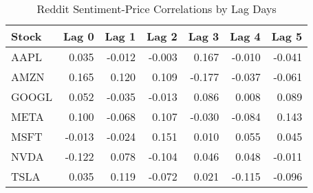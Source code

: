 \begin{table}[h!]
\centering
\caption{Reddit Sentiment-Price Correlations by Lag Days}
\label{tab:reddit_lag_correlations}
\begin{tabular}{lrrrrrr}
\hline
Stock & Lag 0 & Lag 1 & Lag 2 & Lag 3 & Lag 4 & Lag 5 \\
\hline
AAPL & 0.035 & -0.012 & -0.003 & 0.167 & -0.010 & -0.041 \\
AMZN & 0.165 & 0.120 & 0.109 & -0.177 & -0.037 & -0.061 \\
GOOGL & 0.052 & -0.035 & -0.013 & 0.086 & 0.008 & 0.089 \\
META & 0.100 & -0.068 & 0.107 & -0.030 & -0.084 & 0.143 \\
MSFT & -0.013 & -0.024 & 0.151 & 0.010 & 0.055 & 0.045 \\
NVDA & -0.122 & 0.078 & -0.104 & 0.046 & 0.048 & -0.011 \\
TSLA & 0.035 & 0.119 & -0.072 & 0.021 & -0.115 & -0.096 \\
\hline
\end{tabular}
\end{table}
